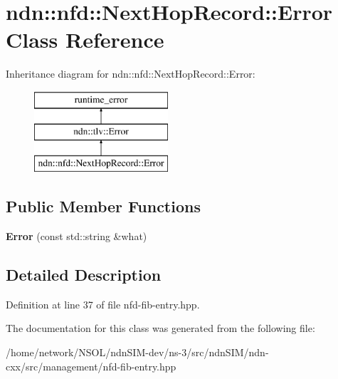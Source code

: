 \hypertarget{classndn_1_1nfd_1_1NextHopRecord_1_1Error}{}\section{ndn\+:\+:nfd\+:\+:Next\+Hop\+Record\+:\+:Error Class Reference}
\label{classndn_1_1nfd_1_1NextHopRecord_1_1Error}
Inheritance diagram for ndn\+:\+:nfd\+:\+:Next\+Hop\+Record\+:\+:Error\+:\begin{figure}[H]
\begin{center}
\leavevmode
\includegraphics[height=3.000000cm]{classndn_1_1nfd_1_1NextHopRecord_1_1Error}
\end{center}
\end{figure}
\subsection*{Public Member Functions}
\begin{DoxyCompactItemize}
\item 
{\bfseries Error} (const std\+::string \&what)\hypertarget{classndn_1_1nfd_1_1NextHopRecord_1_1Error_ae91d464de673cdbb27cc804d1c06fe62}{}\label{classndn_1_1nfd_1_1NextHopRecord_1_1Error_ae91d464de673cdbb27cc804d1c06fe62}

\end{DoxyCompactItemize}


\subsection{Detailed Description}


Definition at line 37 of file nfd-\/fib-\/entry.\+hpp.



The documentation for this class was generated from the following file\+:\begin{DoxyCompactItemize}
\item 
/home/network/\+N\+S\+O\+L/ndn\+S\+I\+M-\/dev/ns-\/3/src/ndn\+S\+I\+M/ndn-\/cxx/src/management/nfd-\/fib-\/entry.\+hpp\end{DoxyCompactItemize}
